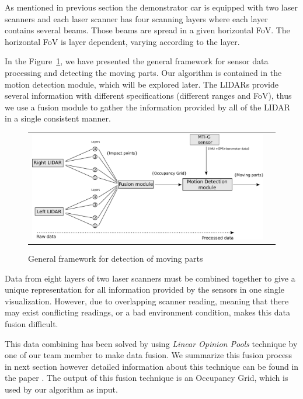 As mentioned in previous section the demonstrator car is equipped with two laser scanners and each laser scanner has four scanning layers where each layer contains several beams. Those beams are spread in a given horizontal FoV. The horizontal FoV is layer dependent, varying according to the layer.

In the Figure~\ref{fig:motion:framework}, we have presented the general framework for sensor data processing and detecting the moving parts. Our algorithm is contained in the motion detection module, which will be explored later. The LIDARs provide several information with different specifications (different ranges and FoV), thus we use a fusion module to gather the information provided by all of the LIDAR in a single consistent manner.

\begin{figure}[H]
   \centering
     \begin{tabular}{lr}
       \includegraphics[scale=0.30]{img/fig:motion:framework}
     \end{tabular}
   \caption{General framework for detection of moving parts}
   \label{fig:motion:framework}
\end{figure}

Data from eight layers of two laser scanners must be combined together to give a unique representation for all information provided by the sensors in one single visualization. However, due to  overlapping scanner reading, meaning that there may exist conflicting readings, or a bad environment condition, makes this data fusion difficult.

This data combining has been solved by using \textit{Linear Opinion Pools} technique  by one of our team member to make data fusion. We summarize this fusion process in next section however detailed information about this technique can be found in the paper \cite{ADARVE-2012-671211}. The output of this fusion technique is an Occupancy Grid, which is used by our algorithm as input.

